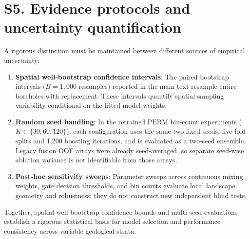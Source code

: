 \documentclass[preprint,12pt,nopreprintline]{elsarticle}
\begin{document}
\section{S5. Evidence protocols and uncertainty quantification}
\label{sec:supp-protocols}
A rigorous distinction must be maintained between different sources of empirical uncertainty:
\begin{enumerate}
\item \textbf{Spatial well-bootstrap confidence intervals}: The paired bootstrap intervals ($B=1,000$ resamples) reported in the main text resample entire boreholes with replacement. These intervals quantify spatial sampling variability conditional on the fitted model weights.
\item \textbf{Random seed handling}: In the retrained $\mathrm{PERM}$ bin-count experiments ($K \in \{30, 60, 120\}$), each configuration uses the same two fixed seeds, five-fold splits and 1,200 boosting iterations, and is evaluated as a two-seed ensemble. Legacy fusion OOF arrays were already seed-averaged, so separate seed-wise ablation variance is not identifiable from those arrays.
\item \textbf{Post-hoc sensitivity sweeps}: Parameter sweeps across continuous mixing weights, gate decision thresholds, and bin counts evaluate local landscape geometry and robustness; they do not construct new independent blind tests.
\end{enumerate}
Together, spatial well-bootstrap confidence bounds and multi-seed evaluations establish a rigorous statistical basis for model selection and performance consistency across variable geological strata.



\end{document}
